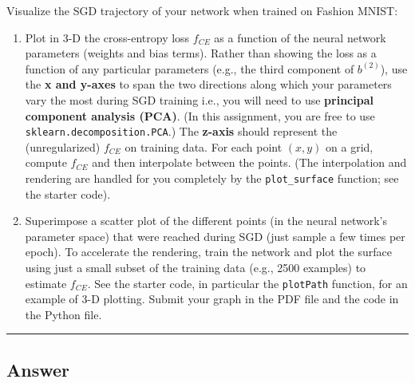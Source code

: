 \documentclass[
  letterpaper,
  DIV=11,
  numbers=noendperiod]{scrartcl}
\begin{document}
Visualize the SGD trajectory of your network when trained on Fashion
MNIST:

\begin{enumerate}
\def\labelenumi{\arabic{enumi}.}
\item
  Plot in 3-D the cross-entropy loss \(f_{CE}\) as a function of the
  neural network parameters (weights and bias terms). Rather than
  showing the loss as a function of any particular parameters (e.g., the
  third component of \(b^{(2)}\)), use the \textbf{x and y-axes} to span
  the two directions along which your parameters vary the most during
  SGD training i.e., you will need to use \textbf{principal component
  analysis (PCA)}. (In this assignment, you are free to use
  \texttt{sklearn.decomposition.PCA}.) The \textbf{z-axis} should
  represent the (unregularized) \(f_{CE}\) on training data. For each
  point \((x,y)\) on a grid, compute \(f_{CE}\) and then interpolate
  between the points. (The interpolation and rendering are handled for
  you completely by the \texttt{plot\_surface} function; see the starter
  code).
\item
  Superimpose a scatter plot of the different points (in the neural
  network's parameter space) that were reached during SGD (just sample a
  few times per epoch). To accelerate the rendering, train the network
  and plot the surface using just a small subset of the training data
  (e.g., 2500 examples) to estimate \(f_{CE}\). See the starter code, in
  particular the \texttt{plotPath} function, for an example of 3-D
  plotting. Submit your graph in the PDF file and the code in the Python
  file.
\end{enumerate}

\begin{center}\rule{0.5\linewidth}{0.5pt}\end{center}

\subsection{Answer}\label{answer-7}
\end{document}
